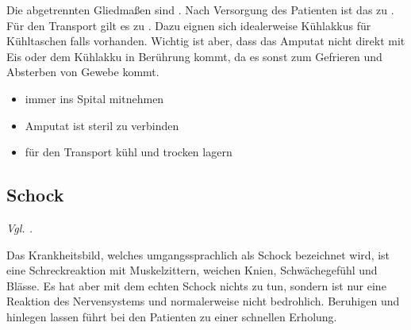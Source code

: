 {
Die abgetrennten Gliedmaßen sind . Nach
Versorgung des Patienten ist das  zu . Für
den Transport gilt es  zu . Dazu eignen
sich idealerweise Kühlakkus für Kühltaschen falls vorhanden. Wichtig ist aber,
dass das Amputat  nicht direkt mit Eis oder dem Kühlakku in Berührung
kommt, da es sonst zum Gefrieren und Absterben von Gewebe kommt.
}{
\begin{itemize}
    \item immer ins Spital mitnehmen
    \item Amputat ist steril zu verbinden
    \item für den Transport kühl und trocken lagern
\end{itemize}
}{}{}{}





\subsection{Schock}


\emph{Vgl. .}

Das Krankheitsbild, welches umgangssprachlich als Schock bezeichnet wird, ist
eine Schreckreaktion mit Muskelzittern, weichen Knien, Schwächegefühl und
Blässe. Es hat aber mit dem echten Schock nichts zu tun, sondern ist nur eine
Reaktion des Nervensystems und normalerweise nicht bedrohlich. Beruhigen und
hinlegen lassen führt bei den Patienten zu einer schnellen Erholung.


